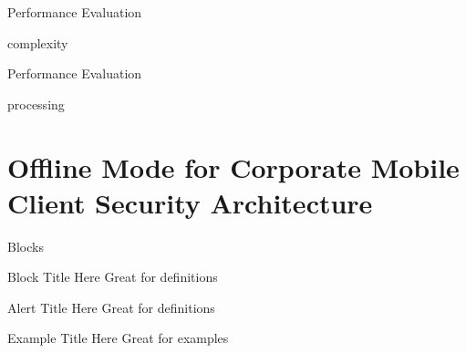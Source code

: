 \documentclass[newPxFont, numfooter, sectionpages]{beamer}
\begin{document}
\begin{frame}{Performance Evaluation}
	
	complexity
	
\end{frame}
\begin{frame}{Performance Evaluation}
	
	processing
	
\end{frame}





























\section{Offline Mode for Corporate Mobile Client Security Architecture}
\label{Blocks}

\begin{frame}{Blocks}

\begin{block}{Block Title Here}
		Great for definitions
\end{block}

\begin{alertblock}{Alert Title Here}
		Great for definitions
\end{alertblock}

\begin{exampleblock}{Example Title Here}
		Great for examples
\end{exampleblock}
\end{frame}
\end{document}
